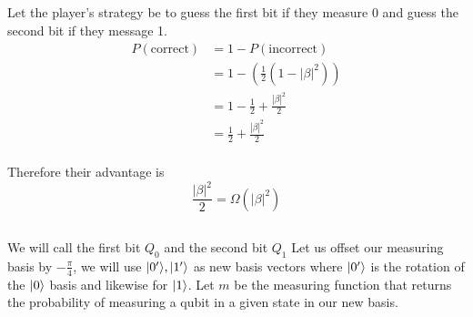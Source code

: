 \subsection{}
Let the player's strategy be to guess the first bit if they measure 0 and guess the second bit if they message 1.
\begin{align*}
    P(\text{correct}) &= 1-P(\text{incorrect})\\
        &= 1-(\frac{1}{2}(1-|\beta|^2))\\
        &= 1-\frac{1}{2} + \frac{|\beta|^2}{2}\\
        &= \frac{1}{2} + \frac{|\beta|^2}{2}\\
\end{align*}

Therefore their advantage is 
\[\frac{|\beta|^2}{2} = \Omega(|\beta|^2)\]


\subsection{}
We will call the first bit $Q_0$ and the second bit $Q_1$
Let us offset our measuring basis by $-\frac{\pi}{4}$, we will use $\lvert0'\rangle,\lvert1'\rangle$ as new basis vectors where $\lvert0'\rangle$ is the rotation of the $\lvert0\rangle$ basis and likewise for $\lvert1\rangle$.
Let $m$ be the measuring function that returns the probability of measuring a qubit in a given state in our new basis.

